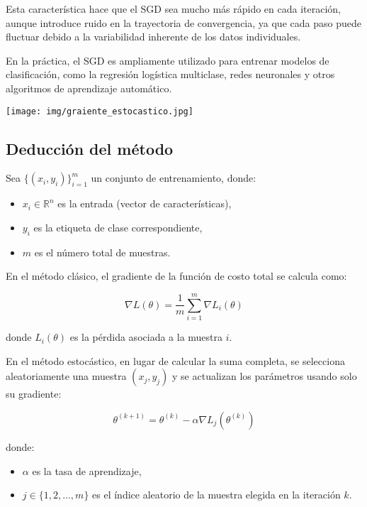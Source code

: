 \documentclass[12pt, letterpaper,conference]{IEEEtran}
\begin{document}
Esta característica hace que el SGD sea mucho más rápido en cada iteración, aunque introduce ruido en la trayectoria de convergencia, ya que cada paso puede fluctuar debido a la variabilidad inherente de los datos individuales.

En la práctica, el SGD es ampliamente utilizado para entrenar modelos de clasificación, como la regresión logística multiclase, redes neuronales y otros algoritmos de aprendizaje automático.

\vspace{0.3cm}

\texttt{[image: img/graiente\_estocastico.jpg]}

\vspace{0.25cm}


\subsection{Deducción del método}

Sea \( \{ (x_i, y_i) \}_{i=1}^{m} \) un conjunto de entrenamiento, donde:
\begin{itemize}
    \item \( x_i \in \mathbb{R}^n \) es la entrada (vector de características),
    \item \( y_i \) es la etiqueta de clase correspondiente,
    \item \( m \) es el número total de muestras.
\end{itemize}

En el método clásico, el gradiente de la función de costo total se calcula como:

\[
\nabla L(\theta) = \frac{1}{m} \sum_{i=1}^{m} \nabla L_i(\theta)
\]

donde \( L_i(\theta) \) es la pérdida asociada a la muestra \( i \).

En el método estocástico, en lugar de calcular la suma completa, se selecciona aleatoriamente una muestra \( (x_j, y_j) \) y se actualizan los parámetros usando solo su gradiente:

\[
\theta^{(k+1)} = \theta^{(k)} - \alpha \nabla L_j(\theta^{(k)})
\]

donde:
\begin{itemize}
    \item \( \alpha \) es la tasa de aprendizaje,
    \item \( j \in \{1, 2, \dots, m\} \) es el índice aleatorio de la muestra elegida en la iteración \( k \).
\end{itemize}
\end{document}
